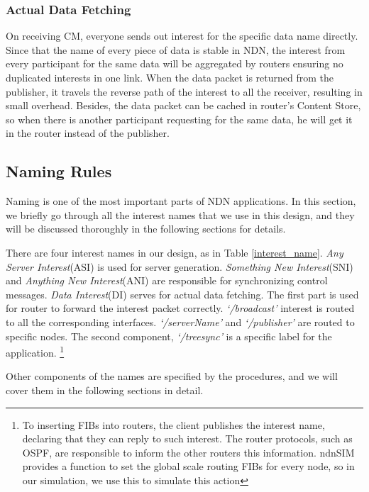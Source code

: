 \documentclass[conference]{IEEEtran}
\begin{document}
\subsubsection{Actual Data Fetching}
On receiving CM, everyone sends out interest for the specific data name directly.
Since that the name of every piece of data is stable in NDN,
the interest from every participant for the same data
will be aggregated by routers ensuring no duplicated interests in one link.
When the data packet is returned from the publisher,
it travels the reverse path of the interest to all the receiver,
resulting in small overhead. Besides, the data packet can be cached in router's Content Store,
so when there is another participant requesting for the same data,
he will get it in the router instead of the publisher.

\subsection{Naming Rules}

Naming is one of the most important parts of NDN applications.
In this section, we briefly go through all the interest names that we use in this design,
and they will be discussed thoroughly in the following sections for details.

There are four interest names in our design, as in Table \ref{interest_name}.
\emph{Any Server Interest}(ASI) is used for server generation.
\emph{Something New Interest}(SNI) and \emph{Anything New Interest}(ANI) are responsible for synchronizing control messages.
\emph{Data Interest}(DI) serves for actual data fetching.
The first part is used for router to forward the interest packet correctly.
\emph{`/broadcast'} interest is routed to all the corresponding interfaces.
\emph{`/serverName'} and \emph{`/publisher'} are routed to specific nodes.
The second component, \emph{`/treesync'} is a specific label for the application.
\footnote{To inserting FIBs into routers, the client publishes the interest name,
declaring that they can reply to such interest.
The router protocols, such as OSPF\cite{OSPF}\cite{OSPFN},
are responsible to inform the other routers this information.
ndnSIM provides a function to set the global scale routing FIBs for every node,
so in our simulation, we use this to simulate this action}

Other components of the names are specified by the procedures,
and we will cover them in the following sections in detail.
\end{document}

